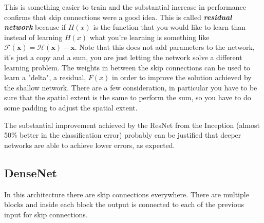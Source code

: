 This is something easier to train and the substantial increase in performance confirms that skip connections were a good idea. This is called \textbf{\textit{residual network}} because 
if $H(x)$ is the function that you would like to learn than instead of learning $H(x)$ what you're learning is something like $\mathcal{F}(\mathbf{x})=\mathcal{H}(\mathbf{x})-\mathbf{x}$. Note that this does not add parameters to the network, it's just a copy and a sum, you are just letting the network solve a different learning problem. The weights in between the skip connections can be used to learn a "delta", a residual, $F(x)$ in order to improve the solution achieved by the shallow network.  There are a few consideration, in particular you have to be sure that the spatial extent is the same to perform the sum, so you have to do some padding to adjust the spatial extent. 

The substantial improvement achieved by the ResNet from the Inception (almost 50\% better in the classification error) probably can be justified that deeper networks are able to achieve lower errors, as expected. 

\subsection{DenseNet}
In this architecture there are skip connections everywhere. There are multiple blocks and inside each block the output is connected to each of the previous input for skip connections.


